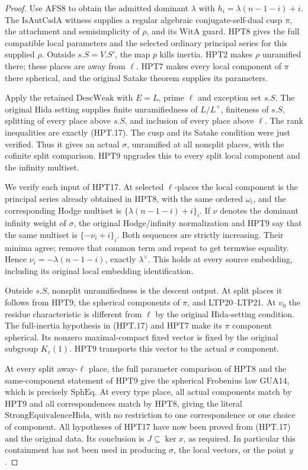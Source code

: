 \documentclass[11pt,a4paper]{article}
\numberwithin{equation}{section}
\theoremstyle{remark}\newtheorem{remark}[theorem]{Remark}
\begin{document}
\begin{proof}
Use AFS8 to obtain the admitted dominant $\lambda$ with
$h_i=\lambda(n-1-i)+i$.  The $\mathrm{IsAutCsdA}$ witness
supplies a regular algebraic conjugate-self-dual cusp $\pi$,
the attachment and semisimplicity of $\rho$, and its $\mathrm{WitA}$
guard.  HPT8 gives the full compatible local parameters and
the selected ordinary principal series for this supplied
$\rho$.  Outside $s.S=V.S'$, the map $p$ kills inertia.
HPT2 makes $\rho$ unramified there; these places are away from
$\ell$.  HPT7 makes every local component of $\pi$ there
spherical, and the original Satake theorem supplies its parameters.

Apply the retained $\mathrm{DescWeak}$ with $E=L$, prime $\ell$
and exception set $s.S$.  The original Hida setting supplies
finite unramifiedness of $L/L^+$, finiteness of $s.S$, splitting
of every place above $s.S$, and inclusion of every place above
$\ell$.  The rank inequalities are exactly (HPT.17).  The
cusp and its Satake condition were just verified.  Thus it gives
an actual $\sigma$, unramified at all nonsplit places, with the
cofinite split comparison.  HPT9 upgrades this to every split
local component and the infinity multiset.

We verify each input of HPT17.  At selected $\ell$-places the
local component is the principal series already obtained in HPT8,
with the same ordered $\omega_i$, and the corresponding Hodge
multiset is $\{\lambda(n-1-i)+i\}_i$.  If $\nu$ denotes the
dominant infinity weight of $\sigma$, the original Hodge/infinity
normalization and HPT9 say that the same multiset is
$\{-\nu_i+i\}_i$.  Both sequences are strictly increasing.
Their minima agree; remove that common term and repeat to get
termwise equality.  Hence $\nu_i=-\lambda(n-1-i)$, exactly
$\lambda^\vee$.  This holds at every source embedding, including
its original local embedding identification.

Outside $s.S$, nonsplit unramifiedness is the descent output.
At split places it follows from HPT9, the spherical components
of $\pi$, and LTP20--LTP21.  At $v_0$ the residue characteristic
is different from $\ell$ by the original Hida-setting condition.
The full-inertia hypothesis in (HPT.17) and HPT7 make its
$\pi$ component spherical.  Its nonzero maximal-compact fixed
vector is fixed by the original subgroup $K_c(1)$.  HPT9
transports this vector to the actual $\sigma$ component.

At every split away-$\ell$ place, the full parameter comparison
of HPT8 and the same-component statement of HPT9 give the
spherical Frobenius law GUA14, which is precisely
$\mathrm{SphEq}$.  At every type place, all actual components
match by HPT9 and all correspondences match by HPT8, giving
the literal $\mathrm{StrongEquivalenceHida}$, with no restriction
to one correspondence or one choice of component.  All hypotheses
of HPT17 have now been proved from (HPT.17) and the original
data.  Its conclusion is $J\subseteq\ker x$, as required.
In particular this containment has not been used in producing
$\sigma$, the local vectors, or the point $y$.
\end{proof}
\end{document}
